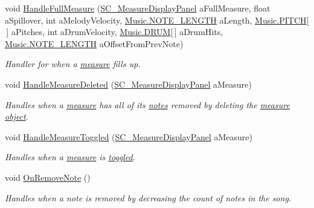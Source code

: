 \begin{DoxyCompactItemize}
void \hyperlink{group___s_c___n_d_c_handlers_ga40c5a3b59608c559ab96ad0338c5e042}{Handle\+Full\+Measure} (\hyperlink{class_s_c___measure_display_panel}{S\+C\+\_\+\+Measure\+Display\+Panel} a\+Full\+Measure, float a\+Spillover, int a\+Melody\+Velocity, \hyperlink{group___music_enums_gaf11b5f079adbb21c800b9eca1c5c3cbd}{Music.\+N\+O\+T\+E\+\_\+\+L\+E\+N\+G\+TH} a\+Length, \hyperlink{group___music_enums_ga508f69b199ea518f935486c990edac1d}{Music.\+P\+I\+T\+CH}\mbox{[}$\,$\mbox{]} a\+Pitches, int a\+Drum\+Velocity, \hyperlink{group___music_enums_gade475b4382c7066d1af13e7c13c029b6}{Music.\+D\+R\+UM}\mbox{[}$\,$\mbox{]} a\+Drum\+Hits, \hyperlink{group___music_enums_gaf11b5f079adbb21c800b9eca1c5c3cbd}{Music.\+N\+O\+T\+E\+\_\+\+L\+E\+N\+G\+TH} a\+Offset\+From\+Prev\+Note)
\begin{DoxyCompactList}\small\item\em Handler for when a \hyperlink{group___doc_s_c___m_d_p}{measure} fills up. \end{DoxyCompactList}\item 
void \hyperlink{group___s_c___n_d_c_handlers_ga40ffb2c779af43930924348c265c9e09}{Handle\+Measure\+Deleted} (\hyperlink{class_s_c___measure_display_panel}{S\+C\+\_\+\+Measure\+Display\+Panel} a\+Measure)
\begin{DoxyCompactList}\small\item\em Handles when a \hyperlink{group___doc_s_c___m_d_p}{measure} has all of its \hyperlink{group___music_structs_struct_music_1_1_combined_note}{notes} removed by deleting the \hyperlink{group___doc_s_c___m_d_p}{measure object}. \end{DoxyCompactList}\item 
void \hyperlink{group___s_c___n_d_c_handlers_ga458d57203645be514d3626211044b584}{Handle\+Measure\+Toggled} (\hyperlink{class_s_c___measure_display_panel}{S\+C\+\_\+\+Measure\+Display\+Panel} a\+Measure)
\begin{DoxyCompactList}\small\item\em Handles when a \hyperlink{group___doc_s_c___m_d_p}{measure} is \hyperlink{group___s_c___m_d_p_handlers_ga31c72fee5ddd5ae7b057b2f265341263}{toggled}. \end{DoxyCompactList}\item 
void \hyperlink{group___s_c___n_d_c_handlers_ga6dbbf12e55681d13f43e489dd4a100dc}{On\+Remove\+Note} ()
\begin{DoxyCompactList}\small\item\em Handles when a note is removed by decreasing the count of notes in the song. \end{DoxyCompactList}\end{DoxyCompactItemize}

